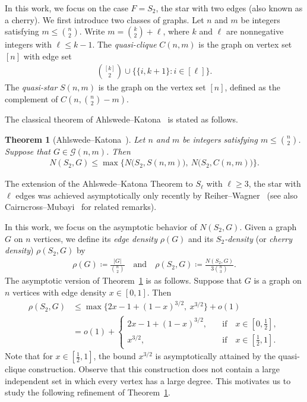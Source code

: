 \documentclass[11pt,a4paper]{article}
\newtheorem{theorem}[definition]{Theorem}
\begin{document}
In this work, we focus on the case $F = S_{2}$, the star with two edges (also known as a cherry). 
We first introduce two classes of graphs. 
Let $n$ and $m$ be integers satisfying $m \le \binom{n}{2}$. 
Write $m = \binom{k}{2} + \ell$, where $k$ and $\ell$ are nonnegative integers with $\ell \le k-1$. 
The \emph{quasi-clique} $C(n,m)$ is the graph on vertex set $[n]$ with edge set 
\begin{align*}
    \binom{[k]}{2} \cup \big\{ \{i, k+1\} \colon i \in [\ell] \big\}. 
\end{align*}
%
The \emph{quasi-star} $S(n,m)$ is the graph on the vertex set $[n]$, defined as the complement of $C\left(n,\binom{n}{2}-m\right)$. 

The classical theorem of Ahlswede--Katona~\cite{AK78} is stated as follows. 

\begin{theorem}[Ahlswede--Katona~\cite{AK78}]\label{THM:AK78S2}
    Let $n$ and $m$ be integers satisfying $m \le \binom{n}{2}$. 
    Suppose that $G \in \mathcal{G}(n,m)$. 
    Then 
    \begin{align*}
        N(S_2, G)
        \le \max\big\{N\big(S_2, S(n,m)\big),~N\big(S_2, C(n,m)\big)\big\}. 
    \end{align*}
\end{theorem}

The extension of the Ahlswede--Katona Theorem to $S_{\ell}$ with $\ell \ge 3$, the star with $\ell$ edges was achieved asymptotically only recently by Reiher--Wagner~\cite{RW18} (see also Cairncross--Mubayi~\cite{CM24} for related remarks). 

In this work, we focus on the asymptotic behavior of $N(S_2, G)$. 
Given a graph $G$ on $n$ vertices, we define its \emph{edge density} $\rho(G)$ and its \emph{$S_{2}$-density} (or \emph{cherry density}) $\rho(S_2, G)$ by 
\begin{align*}
    \rho(G)
    \coloneqq \frac{|G|}{\binom{n}{2}}
    \quad\text{and}\quad 
    \rho(S_2, G)
    \coloneqq \frac{N(S_2, G)}{3\binom{n}{3}}. 
\end{align*}
%
The asymptotic version of Theorem~\ref{THM:AK78S2} is as follows. 
Suppose that $G$ is a graph on $n$ vertices with edge density $x \in [0,1]$. Then 
\begin{align*}
    \rho(S_2, G)
    & \le \max\big\{ 2x -1 +(1-x)^{3/2},~x^{3/2} \big\} +o(1) \\[0.4em]
    & = o(1) + \begin{cases}
        2x -1 +(1-x)^{3/2}, & \quad\text{if}\quad x\in \left[0, \tfrac{1}{2}\right], \\
        x^{3/2}, & \quad\text{if}\quad x\in \left[\tfrac{1}{2}, 1\right]. 
    \end{cases}
\end{align*}
%
Note that for $x\in \left[\tfrac{1}{2}, 1\right]$, the bound $x^{3/2}$ is asymptotically attained by the quasi-clique construction. 
Observe that this construction does not contain a large independent set in which every vertex has a large degree. 
This motivates us to study the following refinement of Theorem~\ref{THM:AK78S2}. 
\end{document}
